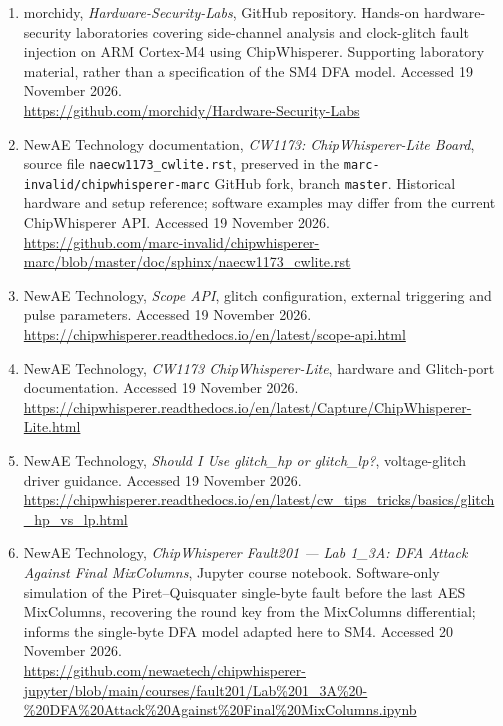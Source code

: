 \begin{enumerate}
\href{https://research.dial.uclouvain.be/entities/publication/f15e3e1b-78b1-4749-925d-fdc1d60c1694}{UCLouvain publication record (online).}
\item morchidy, \emph{Hardware-Security-Labs}, GitHub repository. Hands-on hardware-security laboratories covering side-channel analysis and clock-glitch fault injection on ARM Cortex-M4 using ChipWhisperer. Supporting laboratory material, rather than a specification of the SM4 DFA model. Accessed 19 November 2026.\\
\url{https://github.com/morchidy/Hardware-Security-Labs}
\item NewAE Technology documentation, \emph{CW1173: ChipWhisperer-Lite Board}, source file \texttt{naecw1173\_cwlite.rst}, preserved in the \texttt{marc-invalid/chipwhisperer-marc} GitHub fork, branch \texttt{master}. Historical hardware and setup reference; software examples may differ from the current ChipWhisperer API. Accessed 19 November 2026.\\
\url{https://github.com/marc-invalid/chipwhisperer-marc/blob/master/doc/sphinx/naecw1173_cwlite.rst}
\item NewAE Technology, \emph{Scope API}, glitch configuration, external triggering and pulse parameters. Accessed 19 November 2026.\\
\url{https://chipwhisperer.readthedocs.io/en/latest/scope-api.html}
\item NewAE Technology, \emph{CW1173 ChipWhisperer-Lite}, hardware and Glitch-port documentation. Accessed 19 November 2026.\\
\url{https://chipwhisperer.readthedocs.io/en/latest/Capture/ChipWhisperer-Lite.html}
\item NewAE Technology, \emph{Should I Use glitch\_hp or glitch\_lp?}, voltage-glitch driver guidance. Accessed 19 November 2026.\\
\url{https://chipwhisperer.readthedocs.io/en/latest/cw_tips_tricks/basics/glitch_hp_vs_lp.html}
\item NewAE Technology, \emph{ChipWhisperer Fault201 --- Lab 1\_3A: DFA Attack Against Final MixColumns}, Jupyter course notebook. Software-only simulation of the Piret--Quisquater single-byte fault before the last AES MixColumns, recovering the round key from the MixColumns differential; informs the single-byte DFA model adapted here to SM4. Accessed 20 November 2026.\\
\url{https://github.com/newaetech/chipwhisperer-jupyter/blob/main/courses/fault201/Lab%201_3A%20-%20DFA%20Attack%20Against%20Final%20MixColumns.ipynb}

\end{enumerate}
